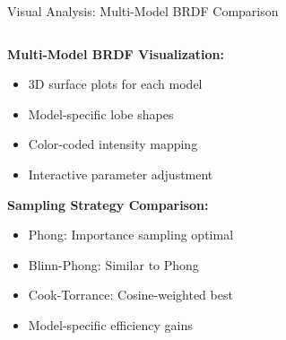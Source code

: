 \documentclass[aspectratio=169]{beamer}
\begin{document}
\begin{frame}{Visual Analysis: Multi-Model BRDF Comparison}
    \begin{columns}
        \begin{column}{0.5\textwidth}
            \textbf{Multi-Model BRDF Visualization:}
            \begin{itemize}
                \item 3D surface plots for each model
                \item Model-specific lobe shapes
                \item Color-coded intensity mapping
                \item Interactive parameter adjustment
            \end{itemize}
            
            \vspace{0.5cm}
            \textbf{Sampling Strategy Comparison:}
            \begin{itemize}
                \item Phong: Importance sampling optimal
                \item Blinn-Phong: Similar to Phong
                \item Cook-Torrance: Cosine-weighted best
                \item Model-specific efficiency gains
            \end{itemize}
        \end{column}
        \begin{column}{0.5\textwidth}
\end{column}
\end{columns}
\end{frame}
\end{document}
